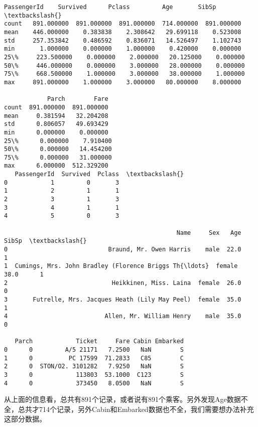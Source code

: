 \documentclass[11pt]{article}
\begin{document}
    \begin{Verbatim}[commandchars=\\\{\}]
       PassengerId    Survived      Pclass         Age       SibSp  \textbackslash{}
count   891.000000  891.000000  891.000000  714.000000  891.000000   
mean    446.000000    0.383838    2.308642   29.699118    0.523008   
std     257.353842    0.486592    0.836071   14.526497    1.102743   
min       1.000000    0.000000    1.000000    0.420000    0.000000   
25\%     223.500000    0.000000    2.000000   20.125000    0.000000   
50\%     446.000000    0.000000    3.000000   28.000000    0.000000   
75\%     668.500000    1.000000    3.000000   38.000000    1.000000   
max     891.000000    1.000000    3.000000   80.000000    8.000000   

            Parch        Fare  
count  891.000000  891.000000  
mean     0.381594   32.204208  
std      0.806057   49.693429  
min      0.000000    0.000000  
25\%      0.000000    7.910400  
50\%      0.000000   14.454200  
75\%      0.000000   31.000000  
max      6.000000  512.329200  
   PassengerId  Survived  Pclass  \textbackslash{}
0            1         0       3   
1            2         1       1   
2            3         1       3   
3            4         1       1   
4            5         0       3   

                                                Name     Sex   Age  SibSp  \textbackslash{}
0                            Braund, Mr. Owen Harris    male  22.0      1   
1  Cumings, Mrs. John Bradley (Florence Briggs Th{\ldots}  female  38.0      1   
2                             Heikkinen, Miss. Laina  female  26.0      0   
3       Futrelle, Mrs. Jacques Heath (Lily May Peel)  female  35.0      1   
4                           Allen, Mr. William Henry    male  35.0      0   

   Parch            Ticket     Fare Cabin Embarked  
0      0         A/5 21171   7.2500   NaN        S  
1      0          PC 17599  71.2833   C85        C  
2      0  STON/O2. 3101282   7.9250   NaN        S  
3      0            113803  53.1000  C123        S  
4      0            373450   8.0500   NaN        S  

    \end{Verbatim}

    从上面的信息看，总共有891个记录，或者说有891个乘客。另外发现Age数据不全，总共才714个记录，另外Cabin和Embarked数据也不全，我们需要想办法补充这部分数据。
\end{document}
